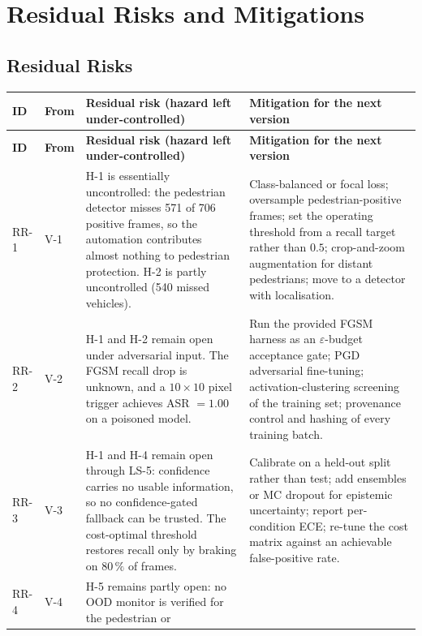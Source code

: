 \documentclass[a4paper,12pt]{article}
\begin{document}
\section{Residual Risks and Mitigations}
\label{sec:residual}

\subsection{Residual Risks}

{\footnotesize
\begin{longtable}{@{}P{0.9cm}P{1.1cm}P{8.2cm}P{4.5cm}@{}}
\toprule
\textbf{ID} & \textbf{From} & \textbf{Residual risk (hazard left under-controlled)} & \textbf{Mitigation for the next version} \\
\midrule
\endfirsthead
\toprule
\textbf{ID} & \textbf{From} & \textbf{Residual risk (hazard left under-controlled)} & \textbf{Mitigation for the next version} \\
\midrule
\endhead
\bottomrule
\endlastfoot
RR-1 & V-1
     & H-1 is essentially uncontrolled: the pedestrian detector misses 571 of 706
       positive frames, so the automation contributes almost nothing to pedestrian
       protection. H-2 is partly uncontrolled (540 missed vehicles).
     & Class-balanced or focal loss; oversample pedestrian-positive frames; set the
       operating threshold from a recall target rather than $0.5$; crop-and-zoom
       augmentation for distant pedestrians; move to a detector with localisation. \\
RR-2 & V-2
     & H-1 and H-2 remain open under adversarial input. The FGSM recall drop is unknown,
       and a $10\times10$ pixel trigger achieves ASR $=1.00$ on a poisoned model.
     & Run the provided FGSM harness as an $\varepsilon$-budget acceptance gate;
       PGD adversarial fine-tuning; activation-clustering screening of the training set;
       provenance control and hashing of every training batch. \\
RR-3 & V-3
     & H-1 and H-4 remain open through LS-5: confidence carries no usable information, so
       no confidence-gated fallback can be trusted. The cost-optimal threshold restores
       recall only by braking on $80\,\%$ of frames.
     & Calibrate on a held-out split rather than test; add ensembles or MC dropout for
       epistemic uncertainty; report per-condition ECE; re-tune the cost matrix against
       an achievable false-positive rate. \\
RR-4 & V-4
     & H-5 remains partly open: no OOD monitor is verified for the pedestrian or

\end{longtable}}
\end{document}
